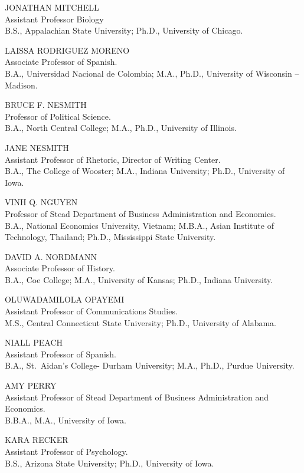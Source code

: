 \documentclass[
  letterpaper,
]{scrbook}
\begin{document}
JONATHAN MITCHELL\\
Assistant Professor Biology\\
B.S., Appalachian State University; Ph.D., University of Chicago.

LAISSA RODRIGUEZ MORENO\\
Associate Professor of Spanish.\\
B.A., Universidad Nacional de Colombia; M.A., Ph.D., University of
Wisconsin -- Madison.

BRUCE F. NESMITH\\
Professor of Political Science.\\
B.A., North Central College; M.A., Ph.D., University of Illinois.

JANE NESMITH\\
Assistant Professor of Rhetoric, Director of Writing Center.\\
B.A., The College of Wooster; M.A., Indiana University; Ph.D.,
University of Iowa.

VINH Q. NGUYEN\\
Professor of Stead Department of Business Administration and
Economics.\\
B.A., National Economics University, Vietnam; M.B.A., Asian Institute of
Technology, Thailand; Ph.D., Mississippi State University.

DAVID A. NORDMANN\\
Associate Professor of History.\\
B.A., Coe College; M.A., University of Kansas; Ph.D., Indiana
University.

OLUWADAMILOLA OPAYEMI\\
Assistant Professor of Communications Studies.\\
M.S., Central Connecticut State University; Ph.D., University of
Alabama.

NIALL PEACH\\
Assistant Professor of Spanish.\\
B.A., St.~Aidan's College- Durham University; M.A., Ph.D., Purdue
University.

AMY PERRY\\
Assistant Professor of Stead Department of Business Administration and
Economics.\\
B.B.A., M.A., University of Iowa.

KARA RECKER\\
Assistant Professor of Psychology.\\
B.S., Arizona State University; Ph.D., University of Iowa.
\end{document}
